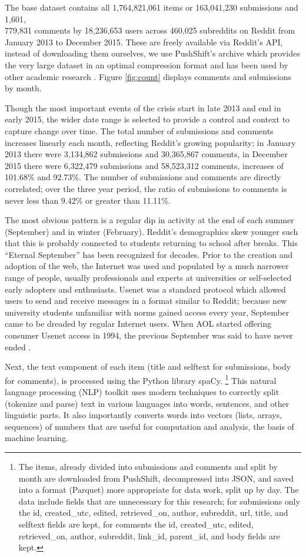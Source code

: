 The base dataset contains all 1,764,821,061 items or 163,041,230 submissions and 1,601,\\779,831 comments by 18,236,653 users across 460,025 subreddits on Reddit from January 2013 to December 2015.
These are freely available via Reddit's API, instead of downloading them ourselves, we use PushShift's archive which provides the very large dataset in an optimal compression format and has been used by other academic research \cite{pushshift}.
Figure \ref{fig:count} displays comments and submissions by month.

Though the most important events of the crisis start in late 2013 and end in  early 2015, the wider date range is selected to provide a control and context to capture change over time.
The total number of submissions and comments increases linearly each month, reflecting Reddit's growing popularity; in January 2013 there were 3,134,862 submissions and 30,365,867 comments, in December 2015 there were 6,322,479 submissions and 58,523,312 comments, increases of 101.68\% and 92.73\%.
The number of submissions and comments are directly correlated; over the three year period, the ratio of submissions to comments is never less than 9.42\% or greater than 11.11\%.

The most obvious pattern is a regular dip in activity at the end of each summer (September) and in winter (February).
Reddit's demographics skew younger such that this is probably connected to students returning to school after breaks.
This ``Eternal September'' has been recognized for decades.
Prior to the creation and adoption of the web, the Internet was used and populated by a much narrower range of people, usually professionals and experts at universities or self-selected early adopters and enthusiasts.
Usenet was a standard protocol which allowed users to send and receive messages in a format similar to Reddit; because new university students unfamiliar with norms gained access every year, September came to be dreaded by regular Internet users.
When AOL started offering consumer Usenet access in 1994, the previous September was said to have never ended \cite[p. 401]{isaacson2014}.

Next, the text component of each item (title and selftext for submissions, body for comments), is processed using the Python library spaCy. \footnote{The items, already divided into submissions and comments and split by month are downloaded from PushShift, decompressed into JSON, and saved into a format (Parquet) more appropriate for data work, split up by day.
The data include fields that are unnecessary for this research; for submissions only the id, created\_utc, edited, retrieved\_on, author, subreddit, url, title, and selftext fields are kept, for comments the id, created\_utc, edited, retrieved\_on, author, subreddit, link\_id, parent\_id, and body fields are kept.}
This natural language processing (NLP) toolkit uses modern techniques to correctly split (tokenize and parse) text in various languages into words, sentences, and other linguistic parts.
It also importantly converts words into vectors (lists, arrays, sequences) of numbers that are useful for computation and analysis, the basis of machine learning.

